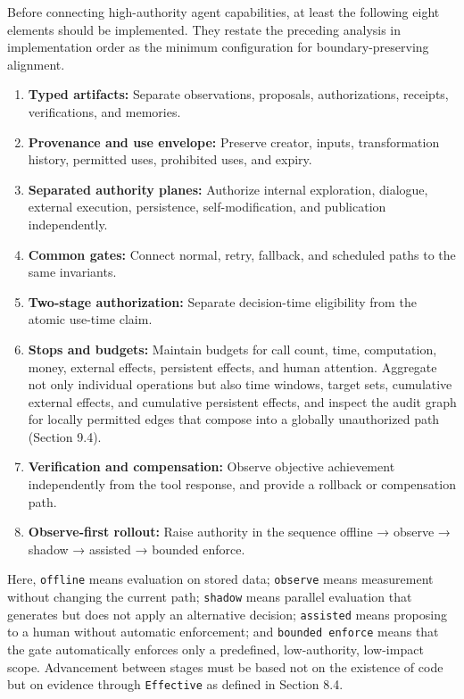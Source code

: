 Before connecting high-authority agent capabilities, at least the following eight elements should be implemented. They restate the preceding analysis in implementation order as the minimum configuration for boundary-preserving alignment.

\begin{enumerate}
\def\labelenumi{\arabic{enumi}.}
\tightlist
\item
  \textbf{Typed artifacts:} Separate observations, proposals, authorizations, receipts, verifications, and memories.
\item
  \textbf{Provenance and use envelope:} Preserve creator, inputs, transformation history, permitted uses, prohibited uses, and expiry.
\item
  \textbf{Separated authority planes:} Authorize internal exploration, dialogue, external execution, persistence, self-modification, and publication independently.
\item
  \textbf{Common gates:} Connect normal, retry, fallback, and scheduled paths to the same invariants.
\item
  \textbf{Two-stage authorization:} Separate decision-time eligibility from the atomic use-time claim.
\item
  \textbf{Stops and budgets:} Maintain budgets for call count, time, computation, money, external effects, persistent effects, and human attention. Aggregate not only individual operations but also time windows, target sets, cumulative external effects, and cumulative persistent effects, and inspect the audit graph for locally permitted edges that compose into a globally unauthorized path (Section 9.4).
\item
  \textbf{Verification and compensation:} Observe objective achievement independently from the tool response, and provide a rollback or compensation path.
\item
  \textbf{Observe-first rollout:} Raise authority in the sequence offline → observe → shadow → assisted → bounded enforce.
\end{enumerate}

Here, \passthrough{\lstinline!offline!} means evaluation on stored data; \passthrough{\lstinline!observe!} means measurement without changing the current path; \passthrough{\lstinline!shadow!} means parallel evaluation that generates but does not apply an alternative decision; \passthrough{\lstinline!assisted!} means proposing to a human without automatic enforcement; and \passthrough{\lstinline!bounded enforce!} means that the gate automatically enforces only a predefined, low-authority, low-impact scope. Advancement between stages must be based not on the existence of code but on evidence through \passthrough{\lstinline!Effective!} as defined in Section 8.4.

